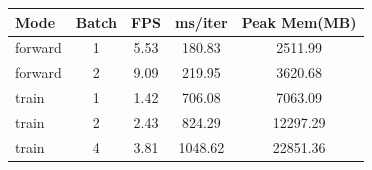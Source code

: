 \begin{tabular}{lcccc}
\toprule
Mode & Batch & FPS & ms/iter & Peak Mem(MB) \\
\midrule
forward & 1 & 5.53 & 180.83 & 2511.99 \\
forward & 2 & 9.09 & 219.95 & 3620.68 \\
train & 1 & 1.42 & 706.08 & 7063.09 \\
train & 2 & 2.43 & 824.29 & 12297.29 \\
train & 4 & 3.81 & 1048.62 & 22851.36 \\
\bottomrule
\end{tabular}
